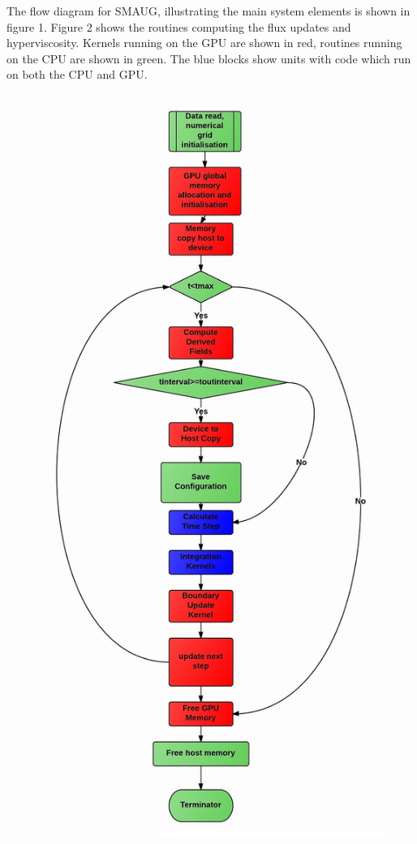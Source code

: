 The flow diagram for SMAUG,  illustrating the main system elements is shown in figure 1. Figure 2  shows the routines computing the flux updates and hyperviscosity. Kernels running on the GPU are shown in red, routines running on the CPU are shown in green. The blue blocks show units with code which run on both the CPU and GPU.\\





\begin{figure}[h]
\includegraphics[scale=1.6]{fig1_smaug_mainflow.jpg}

\end{figure}
